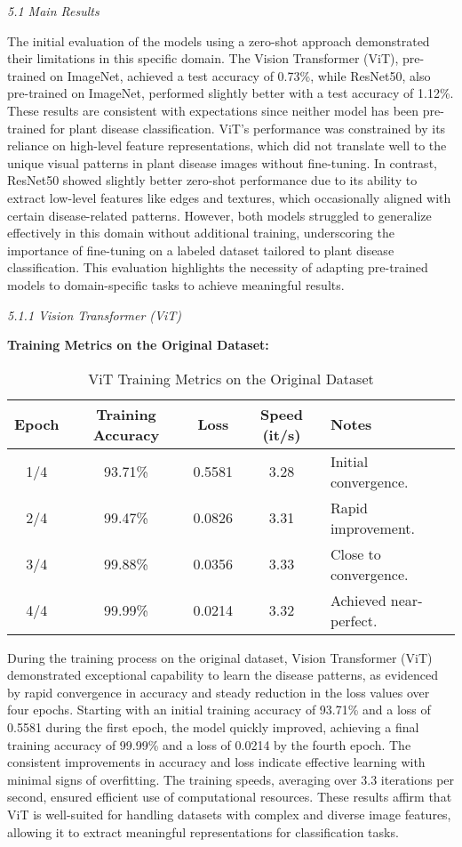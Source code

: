 \documentclass{article}
\begin{document}
\textit{5.1 Main Results}


The initial evaluation of the models using a zero-shot approach demonstrated their limitations in this specific domain. The Vision Transformer (ViT), pre-trained on ImageNet, achieved a test accuracy of 0.73\%, while ResNet50, also pre-trained on ImageNet, performed slightly better with a test accuracy of 1.12\%. These results are consistent with expectations since neither model has been pre-trained for plant disease classification. ViT's performance was constrained by its reliance on high-level feature representations, which did not translate well to the unique visual patterns in plant disease images without fine-tuning. In contrast, ResNet50 showed slightly better zero-shot performance due to its ability to extract low-level features like edges and textures, which occasionally aligned with certain disease-related patterns. However, both models struggled to generalize effectively in this domain without additional training, underscoring the importance of fine-tuning on a labeled dataset tailored to plant disease classification. This evaluation highlights the necessity of adapting pre-trained models to domain-specific tasks to achieve meaningful results.

\textit{5.1.1 Vision Transformer (ViT)}

\textbf{Training Metrics on the Original Dataset:}

\begin{table}[h!]
\centering
\begin{tabular}{|c|c|c|c|l|}
\hline
\textbf{Epoch} & \textbf{Training Accuracy} & \textbf{Loss} & \textbf{Speed (it/s)} & \textbf{Notes} \\ \hline
1/4   & 93.71\%            & 0.5581 & 3.28         & Initial convergence.   \\ \hline
2/4   & 99.47\%            & 0.0826 & 3.31         & Rapid improvement.     \\ \hline
3/4   & 99.88\%            & 0.0356 & 3.33         & Close to convergence.  \\ \hline
4/4   & 99.99\%            & 0.0214 & 3.32         & Achieved near-perfect. \\ \hline
\end{tabular}
\captionsetup{font=small}
\caption{ViT Training Metrics on the Original Dataset}
\end{table}

During the training process on the original dataset, Vision Transformer (ViT) demonstrated exceptional capability to learn the disease patterns, as evidenced by rapid convergence in accuracy and steady reduction in the loss values over four epochs. Starting with an initial training accuracy of 93.71\% and a loss of 0.5581 during the first epoch, the model quickly improved, achieving a final training accuracy of 99.99\% and a loss of 0.0214 by the fourth epoch. The consistent improvements in accuracy and loss indicate effective learning with minimal signs of overfitting. The training speeds, averaging over 3.3 iterations per second, ensured efficient use of computational resources. These results affirm that ViT is well-suited for handling datasets with complex and diverse image features, allowing it to extract meaningful representations for classification tasks.
\end{document}
